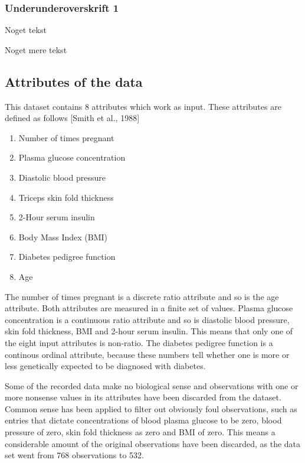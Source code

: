 \subsubsection{Underunderoverskrift 1}

Noget tekst

Noget mere tekst


\subsection{Attributes of the data}
This dataset contains 8 attributes which work as input. These attributes are defined as follows
[Smith et al., 1988]
\begin{enumerate}
\item Number of times pregnant
\item Plasma glucose concentration
\item Diastolic blood pressure
\item Triceps skin fold thickness
\item 2-Hour serum insulin
\item Body Mass Index (BMI)
\item Diabetes pedigree function
\item Age
\end{enumerate}

The number of times pregnant is a discrete ratio attribute and so is
the age attribute. Both attributes are measured in a finite set of values.
Plasma glucose concentration is a continuous ratio attribute
and so is diastolic blood pressure, skin fold thickness, BMI and 2-hour serum
insulin. This means that only one of the eight input attributes is non-ratio.
The diabetes pedigree function is a continous ordinal attribute, because these
numbers tell whether one is more or less genetically expected to be diagnosed
with diabetes.
\bigskip

Some of the recorded data make no biological sense and observations with one or
more nonsense values in its attributes have been discarded from the dataset.
Common sense has been applied to filter out obviously foul observations, such
as entries that dictate concentrations of blood plasma glucose to be zero, blood
pressure of zero, skin fold thickness as zero and BMI of zero. This means a
considerable amount of the original observations have been discarded, as the
data set went from 768 observations to 532.
\bigskip

